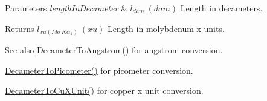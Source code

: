 \begin{DoxyParams}{Parameters}
{\em length\+In\+Decameter} & $ l_{dam}\ (dam)$ Length in decameters. \\
\hline
\end{DoxyParams}
\begin{DoxyReturn}{Returns}
$ l_{xu(Mo\ K\alpha_1)}\ (xu)$ Length in molybdenum x units. 
\end{DoxyReturn}
\begin{DoxySeeAlso}{See also}
\mbox{\hyperlink{group___e_g_x_math-_conversions-_length_conversions-_decameter-_non-_s_i_ga2ea722ea1c773432c2680fe6ebd67638}{Decameter\+To\+Angstrom()}} for angstrom conversion. 

\mbox{\hyperlink{group___e_g_x_math-_conversions-_length_conversions-_decameter-_s_i_gab265bbced03f7b08cf4ad0db29da6dfd}{Decameter\+To\+Picometer()}} for picometer conversion. 

\mbox{\hyperlink{group___e_g_x_math-_conversions-_length_conversions-_decameter-_non-_s_i_gaf256500ca4f0b7a62018ea61078c29e3}{Decameter\+To\+Cu\+X\+Unit()}} for copper x unit conversion. 
\end{DoxySeeAlso}
